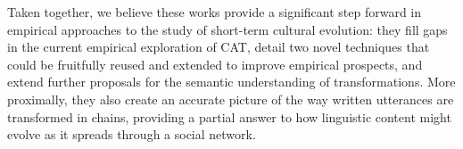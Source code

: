 \documentclass[english,]{article}
\begin{document}
Taken together, we believe these works provide a significant step forward in empirical approaches to the study of short-term cultural evolution:
they fill gaps in the current empirical exploration of CAT, detail two novel techniques that could be fruitfully reused and extended to improve empirical prospects, and extend further proposals for the semantic understanding of transformations.
More proximally, they also create an accurate picture of the way written utterances are transformed in chains, providing a partial answer to how linguistic content might evolve as it spreads through a social network.



\printbibliography[title=Bibliography]
\end{document}
